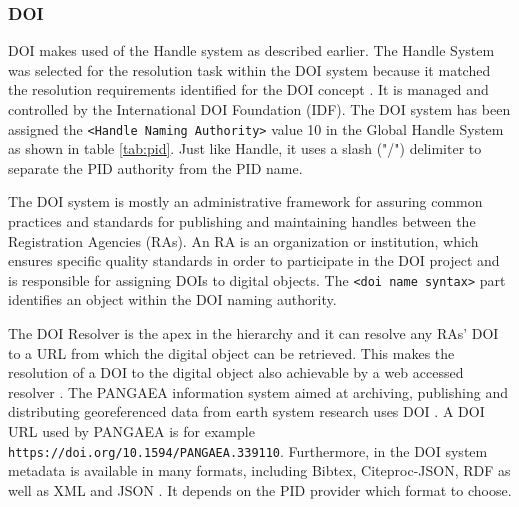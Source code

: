 \subsubsection{DOI}\label{doi}
DOI makes used of the Handle system as described earlier. The Handle System was selected for the resolution task within the DOI system because it matched the resolution requirements identified for the DOI concept \cite{doi-found}. It is managed and
controlled by the International DOI Foundation (IDF). The DOI system has been assigned the \texttt{<Handle Naming Authority>} value 10 in the Global Handle System as shown in table \ref{tab:pid}. Just like Handle, it uses a slash ("/") delimiter to separate the PID authority from the PID name.

The DOI system is mostly an administrative framework for assuring common practices and standards for publishing and maintaining handles between the Registration Agencies (RAs). An RA is an organization or institution, which ensures specific quality standards in order to participate in the DOI project and is responsible for assigning DOIs to digital objects. 
The \texttt{<doi name syntax>} part identifies an object within the DOI naming authority. 

The DOI Resolver is the apex in the hierarchy and it can resolve any RAs' DOI to a URL from which the digital object can be retrieved. 
This makes the resolution of a DOI to the digital object also achievable by a web accessed resolver \cite{icn-bd}. The PANGAEA information system aimed at archiving, publishing and distributing georeferenced data from earth system research uses DOI \cite{pang}. A DOI URL used by PANGAEA is for example \texttt{https://doi.org/10.1594/PANGAEA.339110}.
Furthermore, in the DOI system metadata is available in many formats, including Bibtex, Citeproc-JSON, RDF as well as XML and JSON \cite{doi-met}. It depends on the PID provider which format to choose.


